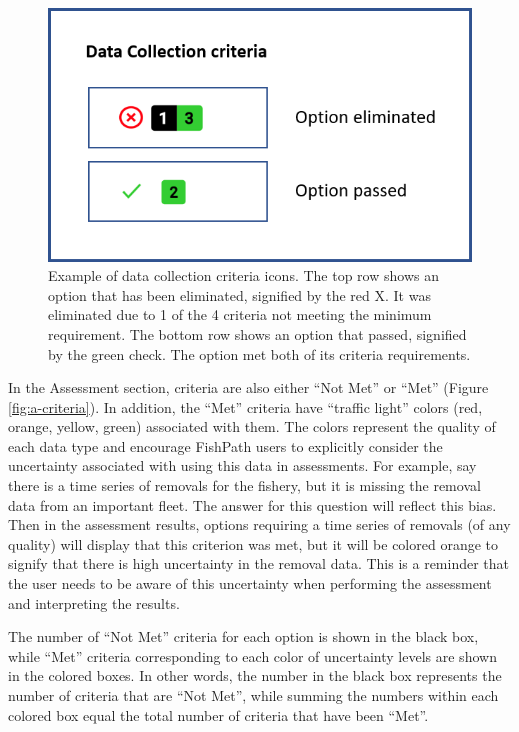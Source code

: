 \documentclass[
  11pt,
]{book}
\begin{document}
\begin{figure}

{\centering \includegraphics[width=0.35\linewidth]{images/dc-criteria} 

}

\caption{Example of data collection criteria icons. The top row shows an option that has been eliminated, signified by the red X. It was eliminated due to 1 of the 4 criteria not meeting the minimum requirement. The bottom row shows an option that passed, signified by the green check. The option met both of its criteria requirements.}\label{fig:dc-criteria}
\end{figure}

In the Assessment section, criteria are also either ``Not Met'' or ``Met'' (Figure \ref{fig:a-criteria}). In addition, the ``Met'' criteria have ``traffic light'' colors (red, orange, yellow, green) associated with them. The colors represent the quality of each data type and encourage FishPath users to explicitly consider the uncertainty associated with using this data in assessments. For example, say there is a time series of removals for the fishery, but it is missing the removal data from an important fleet. The answer for this question will reflect this bias. Then in the assessment results, options requiring a time series of removals (of any quality) will display that this criterion was met, but it will be colored orange to signify that there is high uncertainty in the removal data. This is a reminder that the user needs to be aware of this uncertainty when performing the assessment and interpreting the results.

The number of ``Not Met'' criteria for each option is shown in the black box, while ``Met'' criteria corresponding to each color of uncertainty levels are shown in the colored boxes. In other words, the number in the black box represents the number of criteria that are ``Not Met'', while summing the numbers within each colored box equal the total number of criteria that have been ``Met''.
\end{document}

